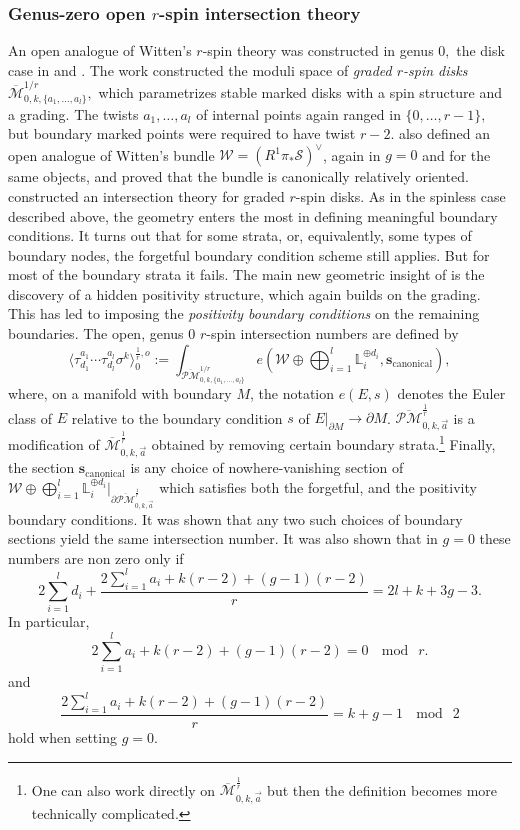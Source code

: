 \documentclass[11pt]{amsart}
\theoremstyle{definition}
\theoremstyle{remark}
\newcommand{\Mbarr}{{{\overline{\mathcal{M}}}^{\frac{1}{r}}_{0,k,\vec{a}}}}
\newcommand{\oPM}{{\overline{\mathcal{PM}}}^{1/r}}
\newcommand{\oPMr}{{{\overline{\mathcal{PM}}}^{\frac{1}{r}}_{0,k,\vec{a}}}}
\newcommand{\<}{\left<}
\renewcommand{\>}{\right>}
\numberwithin{equation}{section}
\def\Mbar{{\overline{\mathcal M}}}
\begin{document}
\subsubsection{Genus-zero open $r$-spin intersection theory}
An open analogue of Witten's $r$-spin theory was constructed in genus $0,$ the disk case in \cite{BCT1,BCT2} and \cite{TZ1,TZ2}.
The work \cite{BCT1} constructed the moduli space of \emph{graded $r$-spin disks}~$\Mbar_{0,k,\{a_1, \ldots, a_l\}}^{1/r},$ which parametrizes stable marked disks with a spin structure and a grading. The twists $a_1,\ldots,a_l$ of internal points again ranged in $\{0,\ldots,r-1\},$ but boundary marked points were required to have twist $r-2.$ \cite{BCT1} also defined an open analogue of Witten's bundle $\mathcal{W}=(R^1\pi_*\mathcal{S})^{\vee}$, again in $g=0$ and for the same objects, and proved that the bundle is canonically relatively oriented.
\cite{BCT2} constructed an intersection theory for graded $r$-spin disks. As in the spinless case described above, the geometry enters the most in defining meaningful boundary conditions.
It turns out that for some strata, or, equivalently, some types of boundary nodes, the forgetful boundary condition scheme still applies. But for most of the boundary strata it fails. The main new geometric insight of \cite{BCT2} is the discovery of a hidden positivity structure, which again builds on the grading. This has led to imposing the \emph{positivity boundary conditions} on the remaining boundaries. 
The open, genus $0$ $r$-spin intersection numbers are defined by
\begin{equation}
\label{eq:intnums}
\langle\tau_{d_1}^{a_1}\cdots\tau^{a_l}_{d_l}\sigma^k\rangle^{\frac{1}{r},o}_0:=\int_{\oPM_{0,k,\{a_1, \ldots, a_l\}}} e\left( \mathcal{W} \oplus \bigoplus_{i=1}^l \mathbb{L}_i^{\oplus d_i}, \mathbf{s}_{\text{canonical}}\right),
\end{equation}
where, on a manifold with boundary $M$, the notation $e(E,s)$ denotes the Euler class of $E$ relative to the boundary condition $s$ of $E|_{\partial M}\to \partial M$. $\oPMr$ is a modification of $\Mbarr$ obtained by removing certain boundary strata.\footnote{One can also work directly on $\Mbarr$ but then the definition becomes more technically complicated.} Finally, the section $\mathbf{s}_{\text{canonical}}$ is any choice of nowhere-vanishing section of $\mathcal{W} \oplus \bigoplus_{i=1}^l\mathbb{L}_i^{\oplus d_i}|_{\partial\oPMr}$ which satisfies both the forgetful, and the positivity boundary conditions.  It was shown that any two such choices of boundary sections yield the same intersection number.
It was also shown that in $g=0$ these numbers are non zero only if
\begin{equation}\label{eq:dim_equal_rk}
2\sum_{i=1}^l d_i +\frac{2\sum_{i=1}^la_i+k(r-2)+(g-1)(r-2)}{r}=2l+k+3g-3.
\end{equation}
In particular, 
\begin{equation}\label{eq:mod_r_general_g}
{2\sum_{i=1}^la_i+k(r-2)+(g-1)(r-2)}=0~\mod~r.
\end{equation}
and
\begin{equation}\label{eq:mod_2_general_g}
\frac{2\sum_{i=1}^la_i+k(r-2)+(g-1)(r-2)}{r} = k+g-1~\mod~2
\end{equation}
hold when setting $g=0.$ 
\end{document}
